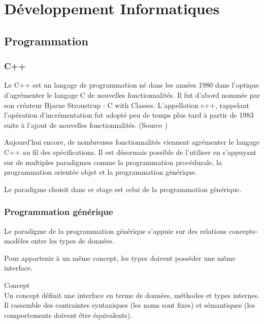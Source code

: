 \section{Développement Informatiques}

\subsection{Programmation}

\subsubsection{C++}

Le C++ est un langage de programmation né dans les années 1980 dans l'optique d'agrémenter le langage C de nouvelles fonctionnalités. Il fut d'abord nommée par son créateur Bjarne Stroustrup : C with Classes. L’appellation c++, rappelant l'opération d'incrémentation fut adopté peu de temps plus tard à partir de 1983 suite à l'ajout de nouvelles fonctionnalités. (Source \cite{Wiki-cpp})

Aujourd'hui encore, de nombreuses fonctionnalités viennent agrémenter le langage C++ au fil des spécifications. Il est désormais possible de l'utiliser en s'appuyant sur de multiples paradigmes comme la programmation procédurale, la programmation orientée objet et la programmation générique.

Le paradigme choisit dans ce stage est celui de la programmation générique. \cite{troussil-cpp}

\subsubsection{Programmation générique}


Le paradigme de la programmation générique s'appuie sur des relations concepts-modèles entre les types de données.  

Pour appartenir à un même concept, les types doivent posséder une même interface. 

\begin{Definition}{Concept}\\
\label{def:cpp-con}
    Un concept définit une interface en terme de données, méthodes et types internes. Il rassemble des contraintes syntaxiques (les noms sont fixes) et sémantiques (les comportements doivent être équivalents). 
\end{Definition}

